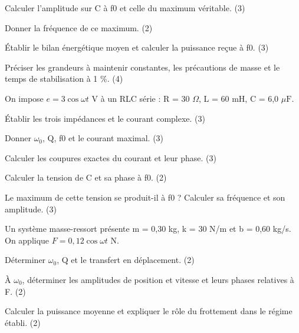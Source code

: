 \begin{questions}
\item Calculer l’amplitude sur C à f0 et celle du maximum véritable. (3)
\item Donner la fréquence de ce maximum. (2)
\item Établir le bilan énergétique moyen et calculer la puissance reçue à f0. (3)
\end{questions}

\begin{questions}
\item Préciser les grandeurs à maintenir constantes, les précautions de masse et le temps de stabilisation à 1 \%. (4)
\end{questions}



On impose $e=3\cos\omega t$ V à un RLC série : R = 30 $\Omega$, L = 60 mH, C = 6,0 $\mu\mathrm F$.\begin{questions}
\item Établir les trois impédances et le courant complexe. (3)
\item Donner $\omega_0$, Q, f0 et le courant maximal. (3)
\end{questions}

\begin{questions}
\item Calculer les coupures exactes du courant et leur phase. (3)
\item Calculer la tension de C et sa phase à f0. (2)
\item Le maximum de cette tension se produit-il à f0 ? Calculer sa fréquence et son amplitude. (3)
\end{questions}



Un système masse-ressort présente m = 0,30 kg, k = 30 N/m et b = 0,60 kg/s. On applique $F=0{,}12\cos\omega t$ N.\begin{questions}
\item Déterminer $\omega_0$, Q et le transfert en déplacement. (2)
\item À $\omega_0$, déterminer les amplitudes de position et vitesse et leurs phases relatives à F. (2)
\item Calculer la puissance moyenne et expliquer le rôle du frottement dans le régime établi. (2)
\end{questions}

